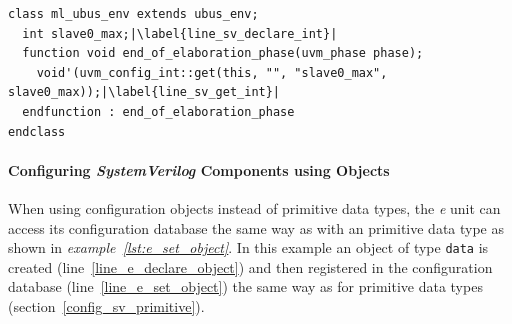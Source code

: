 \lstset{language=SystemVerilog, numbers = left, escapechar=|, breaklines=true}
\begin{lstlisting}[frame=htrbl, caption={SystemVerilog: getting an integer from configuration database},
label={lst:SV_get_int}]
class ml_ubus_env extends ubus_env;
  int slave0_max;|\label{line_sv_declare_int}|
  function void end_of_elaboration_phase(uvm_phase phase);
    void'(uvm_config_int::get(this, "", "slave0_max", slave0_max));|\label{line_sv_get_int}|
  endfunction : end_of_elaboration_phase
endclass
\end{lstlisting}

\paragraph{Configuring \emph{SystemVerilog} Components using Objects}\label{e_config_sv_object}

When using configuration objects instead of primitive data types, the \textit{e} unit can access its configuration
database the same way as with an primitive data type as shown in \emph{example~\ref{lst:e_set_object}}. In this example
an object of type \lstinline$data$ is created (line~\ref{line_e_declare_object}) and then registered in the
configuration database (line~\ref{line_e_set_object}) the same way as for primitive data types
(section~\ref{config_sv_primitive}).

